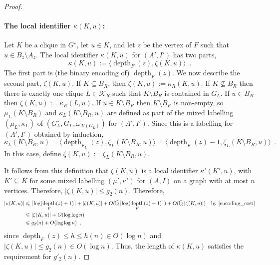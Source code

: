 \documentclass{patmorin}
\let\eqref\cref
\renewcommand{\le}{\leqslant}
\renewcommand{\leq}{\leqslant}
\DeclareMathOperator{\depth}{depth}
\DeclareMathOperator{\lgg}{\hat{lg}}
\newcommand{\Oh}{O}
\DeclarePairedDelimiter{\ceil}{\lceil}{\rceil}
\newcommand{\calK}{\mathcal{K}}
\begin{document}
\begin{proof}
  \paragraph{\boldmath The local identifier $\kappa(K,u)$:}
  Let $K$ be a clique in $G^\star$, let $u\in K$, and let $z$ be the vertex of $F$ such that $u\in B_z\setminus A_z$.   The local identifier $\kappa(K,u)$ for $(A',I')$ has two parts,
  \[
    \kappa(K,u) := \langle\depth_F(z),\zeta(K,u)\rangle \enspace .
  \]
  The first part is (the binary encoding of) $\depth_F(z)$. We now describe the second part, $\zeta(K,u)$.  If $K\subseteq B_R$, then $\zeta(K,u):=\kappa_R(K,u)$.
  If $K\not\subseteq B_R$ then there is exactly one clique $L\in\calK_R$ such that $K\setminus B_R$ is contained in $G_L$.  If $u\in B_R$ then $\zeta(K,u):=\kappa_R(L,u)$.  If $u\in K\setminus B_R$ then $K\setminus B_R$ is non-empty, so $\mu_L(K\setminus B_R)$ and  $\kappa_L(K\setminus B_R, u)$ are defined as part of the mixed labelling $(\mu_L,\kappa_L)$ of $(G^\star_L,G_L,\omega_{|V(G_L)})$ for $(A',I')$.
  Since this is a labelling for $(A',I')$ obtained by induction,
  \begin{equation}
    \kappa_L(K\setminus B_R,u)=\langle\depth_{F_L}(z),\zeta_{L}(K\setminus B_R,u)\rangle=\langle\depth_F(z)-1,\zeta_L(K\setminus B_R,u)\rangle\enspace.
    \label{off_by_one}
  \end{equation}
  In this case, define $\zeta(K,u):=\zeta_L(K\setminus B_R,u)$.

  It follows from this definition that $\zeta(K,u)$ is a local identifier $\kappa'(K',u)$, with $K'\subseteq K$ for some mixed labelling $(\mu',\kappa')$ for $(A,I)$ on a graph with at most $n$ vertices.  Therefore, $|\zeta(K,u)|\le g_2(n)$.  Therefore,
  \begin{align*}
    |\kappa(K,u)|
     & \le \ceil{\log(\depth_F(z)+1)} + |\zeta(K,u)|
    + \Oh(\lgg\ceil{\log(\depth_F(z)+1)}) + \Oh(\lgg|\zeta(K,u)|)
     & \text{by \eqref{encoding_cost}}               \\
     & \leq |\zeta(K,u)| + \Oh(\log\log n)           \\
     & \leq g_2(n) +  \Oh(\log\log n)\enspace,
  \end{align*}
  since $\depth_F(z)\le h\le h(n)\in \Oh(\log n)$ and $|\zeta(K,u)|\le g_2(n)\in\Oh(\log n)$.  Thus, the length of $\kappa(K,u)$ satisfies the requirement for $g'_2(n)$.


\end{proof}
\end{document}
